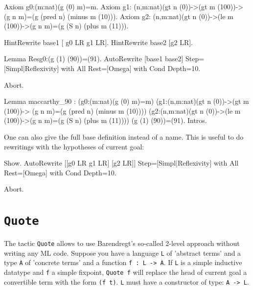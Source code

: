 \begin{coq_example*}
\begin{coq_example*}
Axiom g0:(m:nat)(g (0) m)=m.
Axiom g1:
  (n,m:nat)(gt n (0))->(gt m (100))->
  (g n m)=(g (pred n) (minus m (10))).
Axiom g2:
  (n,m:nat)(gt n (0))->(le m (100))->(g n m)=(g (S n) (plus m (11))).
\end{coq_example*}

\begin{coq_example}
HintRewrite base1 [ g0 LR g1 LR].
HintRewrite base2 [g2 LR].

Lemma Resg0:(g (1) (90))=(91).
AutoRewrite [base1 base2] 
  Step=[Simpl|Reflexivity] with All
  Rest=[Omega] with Cond 
  Depth=10.
\end{coq_example}
\begin{coq_eval}
Abort.
\end{coq_eval}

\begin{coq_eval}
Lemma maccarthy_90 : 
  (g0:(m:nat)(g (0) m)=m)
  (g1:(n,m:nat)(gt n (0))->(gt m (100))-> (g n m)=(g (pred n) (minus m (10))))
  (g2:(n,m:nat)(gt n (0))->(le m (100))->(g n m)=(g (S n) (plus m (11))))
  (g (1) (90))=(91).
  Intros.
\end{coq_eval}

One can also give the full base definition instead of a name. This is
useful to do rewritings with the hypotheses of current goal:

\begin{coq_example}
  Show.
  AutoRewrite [[g0 LR g1 LR] [g2 LR]] 
  Step=[Simpl|Reflexivity] with All
  Rest=[Omega] with Cond 
  Depth=10.
\end{coq_example}

\begin{coq_eval}
Abort.
\end{coq_eval}

\section{\tt Quote}
\label{Quote-examples}

The tactic \texttt{Quote} allows to use Barendregt's so-called
2-level approach without writing any ML code. Suppose you have a
language \texttt{L} of 
'abstract terms' and a type \texttt{A} of 'concrete terms' 
and a function \texttt{f : L -> A}. If \texttt{L} is a simple
inductive datatype and \texttt{f} a simple fixpoint, \texttt{Quote f}
will replace the head of current goal a convertible term with the form 
\texttt{(f t)}. \texttt{L} must have a constructor of type: \texttt{A
  -> L}. 


\end{coq_example*}
